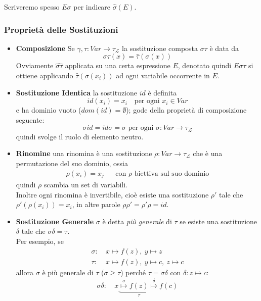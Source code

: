 Scriveremo spesso $E\sigma$ per indicare $\hat{\sigma}(E)$.

\subsubsection{Proprietà delle Sostituzioni}
\begin{itemize}
  \item{\textbf{Composizione}} Se $\gamma, \tau : Var \rightarrow \tau_\mathscr{L}$ la sostituzione composta $\sigma\tau$ è data da
    $$
    \sigma\tau(x) = \hat{\tau}(\sigma(x))
    $$
    Ovviamente $\hat{\sigma\tau}$ applicata su una certa espressione $E$, denotato quindi $E\sigma\tau$ si ottiene applicando $\hat{\tau}(\sigma(x_i))$ ad ogni variabile occorrente in $E$.
    \item{\textbf{Sostituzione Identica}} la sostituzione $id$ è definita 
    $$
    id(x_i) = x_i ~~~  \text{ per ogni } x_i \in Var
    $$
    e ha dominio vuoto ($dom(id) = \emptyset$); gode della proprietà di composizione seguente:
    $$
    \sigma id = id \sigma = \sigma \text{ per ogni } \sigma:Var \rightarrow \tau_\mathscr{L}
    $$
    quindi svolge il ruolo di elemento neutro.
  \item{\textbf{Rinomine}} una rinomina è una sostituzione $\rho: Var \rightarrow \tau_\mathscr{L}$ che è una permutazione del suo dominio, ossia 
    \begin{align*}
    \rho(x_i) = x_j && \text{con $\rho$ biettiva sul suo dominio}
    \end{align*}
    quindi $\rho$ scambia un set di variabili. \\
    Inoltre ogni rinomina è invertibile, cioè esiste una sostituzione $\rho'$ tale che $\rho'(\rho(x_i)) = x_i$, in altre parole $\rho\rho' = \rho'\rho = id$.
  \item{\textbf{Sostituzione Generale}} $\sigma$ è detta \textit{più generale} di $\tau$ se esiste una sostituzione $\delta$ tale che $\sigma\delta = \tau$. \\ 
    Per esempio, se
    \begin{align*}
    \sigma: &\ x \mapsto f(z),\ y \mapsto z \\
    \tau : &\  x \mapsto f(z),\ y \mapsto c,\ z \mapsto c
    \end{align*}
    allora $\sigma$ è più generale di $\tau$ ($\sigma \geq \tau$) perché $\tau = \sigma\delta$ con $\delta: z \mapsto c$:
    \begin{align*}
    \sigma\delta: &\ x \underbrace{\stackrel \sigma \mapsto f(z) \stackrel \delta \mapsto}_{\tau} f(c) \\

\end{align*}
\end{itemize}
